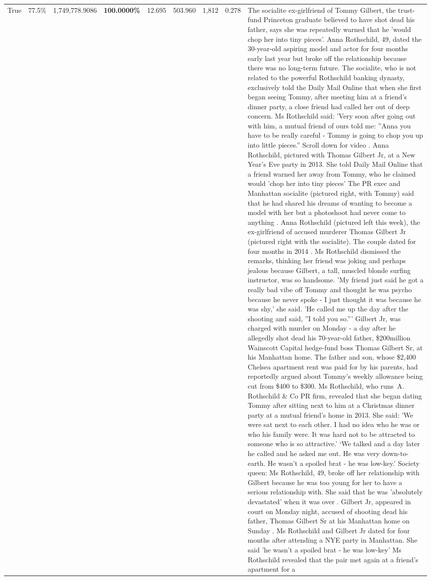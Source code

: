 \begin{table}[H]
\begin{tabular}{lllrlllll}
True & 77.5\% & 1,749,778.9086 & \bfseries \color{red} 100.0000\% & 12.695 & 503.960 & 1,812 & 0.278 & The socialite ex-girlfriend of Tommy Gilbert, the trust-fund Princeton graduate believed to have shot dead his father, says she was repeatedly warned that he 'would chop her into tiny pieces'. Anna Rothschild, 49, dated the 30-year-old aspiring model and actor for four months early last year but broke off the relationship because there was no long-term future. The socialite, who is not related to the powerful Rothschild banking dynasty, exclusively told the Daily Mail Online that when she first began seeing Tommy, after meeting him at a friend's dinner party, a close friend had called her out of deep concern. Ms Rothschild said: 'Very soon after going out with him, a mutual friend of ours told me: ''Anna you have to be really careful - Tommy is going to chop you up into little pieces.'' Scroll down for video . Anna Rothschild, pictured with Thomas Gilbert Jr, at a New Year's Eve party in 2013. She told Daily Mail Online that a friend warned her away from Tommy, who he claimed would 'chop her into tiny pieces' The PR exec and Manhattan socialite (pictured right, with Tommy) said that he had shared his dreams of wanting to become a model with her but a photoshoot had never come to anything . Anna Rothschild (pictured left this week), the ex-girlfriend of accused murderer Thomas Gilbert Jr (pictured right with the socialite). The couple dated for four months in 2014 . Ms Rothschild dismissed the remarks, thinking her friend was joking and perhaps jealous because Gilbert, a tall, muscled blonde surfing instructor, was so handsome. 'My friend just said he got a really bad vibe off Tommy and thought he was psycho because he never spoke - I just thought it was because he was shy,' she said. 'He called me up the day after the shooting and said, ''I told you so.''' Gilbert Jr, was charged with murder on Monday - a day after he allegedly shot dead his 70-year-old father, \$200million Wainscott Capital hedge-fund boss Thomas Gilbert Sr, at his Manhattan home. The father and son, whose \$2,400 Chelsea apartment rent was paid for by his parents, had reportedly argued about Tommy's weekly allowance being cut from \$400 to \$300. Ms Rothschild, who runs A. Rothschild \& Co PR firm, revealed that she began dating Tommy after sitting next to him at a Christmas dinner party at a mutual friend's home in 2013. She said: 'We were sat next to each other. I had no idea who he was or who his family were. It was hard not to be attracted to someone who is so attractive.' ‘We talked and a day later he called and he asked me out. He was very down-to-earth. He wasn’t a spoiled brat - he was low-key.’ Society queen: Ms Rothschild, 49, broke off her relationship with Gilbert because he was too young for her to have a serious relationship with. She said that he was 'absolutely devastated' when it was over . Gilbert Jr, appeared in court on Monday night, accused of shooting dead his father, Thomas Gilbert Sr at his Manhattan home on Sunday . Ms Rothschild and Gilbert Jr dated for four months after attending a NYE party in Manhattan. She said 'he wasn't a spoiled brat - he was low-key' Ms Rothschild revealed that the pair met again at a friend’s apartment for a 
\end{tabular}
\end{table}
